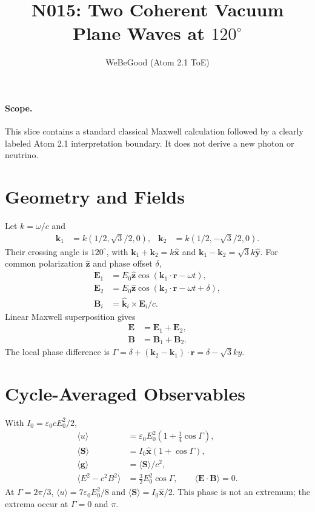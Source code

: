 \documentclass[11pt]{article}
\title{N015: Two Coherent Vacuum Plane Waves at $120^\circ$}
\author{WeBeGood (Atom 2.1 ToE)}
\date{}
\begin{document}
\maketitle

\paragraph{Scope.}
This slice contains a standard classical Maxwell calculation followed by a clearly
labeled Atom 2.1 interpretation boundary. It does not derive a new photon or neutrino.

\section{Geometry and Fields}
Let $k=\omega/c$ and
\begin{align}
 \mathbf{k}_1&=k(1/2,\sqrt{3}/2,0),&
 \mathbf{k}_2&=k(1/2,-\sqrt{3}/2,0).
\end{align}
Their crossing angle is $120^\circ$, with
$\mathbf{k}_1+\mathbf{k}_2=k\hat{\mathbf{x}}$ and
$\mathbf{k}_1-\mathbf{k}_2=\sqrt{3}k\hat{\mathbf{y}}$.
For common polarization $\hat{\mathbf{z}}$ and phase offset $\delta$,
\begin{align}
 \mathbf{E}_1&=E_0\hat{\mathbf{z}}\cos(\mathbf{k}_1\cdot\mathbf{r}-\omega t),\\
 \mathbf{E}_2&=E_0\hat{\mathbf{z}}\cos(\mathbf{k}_2\cdot\mathbf{r}-\omega t+\delta),\\
 \mathbf{B}_i&=\hat{\mathbf{k}}_i\times\mathbf{E}_i/c.
\end{align}
Linear Maxwell superposition gives
\begin{align}
\mathbf{E} &= \mathbf{E}_1 + \mathbf{E}_2,\\
\mathbf{B} &= \mathbf{B}_1 + \mathbf{B}_2.
\end{align}
The local phase difference is
$\Gamma=\delta+(\mathbf{k}_2-\mathbf{k}_1)\cdot\mathbf{r}
=\delta-\sqrt{3}ky$.

\section{Cycle-Averaged Observables}
With $I_0=\varepsilon_0cE_0^2/2$,
\begin{align}
 \langle u\rangle&=\varepsilon_0E_0^2\left(1+\frac14\cos\Gamma\right),\\
 \langle\mathbf{S}\rangle&=I_0\hat{\mathbf{x}}(1+\cos\Gamma),\\
 \langle\mathbf{g}\rangle&=\langle\mathbf{S}\rangle/c^2,\\
 \langle E^2-c^2B^2\rangle&=\frac32E_0^2\cos\Gamma,
 \qquad \langle\mathbf{E}\cdot\mathbf{B}\rangle=0.
\end{align}
At $\Gamma=2\pi/3$, $\langle u\rangle=7\varepsilon_0E_0^2/8$ and
$\langle\mathbf{S}\rangle=I_0\hat{\mathbf{x}}/2$. This phase is not an
extremum; the extrema occur at $\Gamma=0$ and $\pi$.
\end{document}
